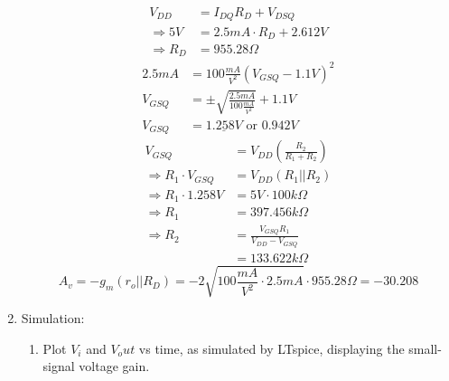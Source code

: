 \documentclass{article}
\begin{document}
\begin{enumerate}
\begin{center}
    \end{center}
    \begin{align}
        V_{DD} &=  I_{DQ}R_D + V_{DSQ}\\
        \Rightarrow 5V &=  2.5mA\cdot R_D + 2.612V\\
        \Rightarrow R_D &=  \boxed{955.28\Omega}
    \end{align}
    \begin{align}
        2.5mA &= 100\frac{mA}{V^2}(V_{GSQ}-1.1V)^2\\
         V_{GSQ} &= \pm\sqrt{\frac{2.5mA}{100\frac{mA}{V^2}}} + 1.1V\\
         V_{GSQ} &= \underline{1.258V}\text{ or }0.942V
    \end{align}
    \begin{align}
        V_{GSQ} &= V_{DD}\left(\frac{R_2}{R_1+R_2}\right)\\
        \Rightarrow R_1\cdot V_{GSQ} &= V_{DD}(R_1||R_2)\\
        \Rightarrow R_1\cdot1.258V &= 5V\cdot100k\Omega\\
        \Rightarrow R_1 &= \boxed{397.456k\Omega}\\
        \Rightarrow R_2 &= \frac{V_{GSQ}R_1}{V_{DD}-V_{GSQ}}\\
        &= \boxed{133.622k\Omega}
    \end{align}
    \begin{equation}
            A_v = -g_m(r_o||R_D) = -2\sqrt{100\frac{mA}{V^2}\cdot 2.5mA} \cdot 955.28\Omega = \boxed{-30.208}
    \end{equation}
\newpage
\item Simulation:
\begin{enumerate}
    \item Plot $V_i$ and $V_out$ vs time, as simulated by LTspice, displaying the small-signal voltage gain.
    \begin{center}
    \end{center}

\end{enumerate}
\end{enumerate}
\end{document}
